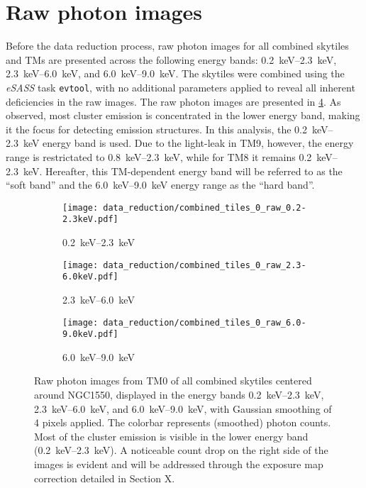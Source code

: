 \section{Raw photon images}
Before the data reduction process, raw photon images for all combined skytiles and TMs are presented across the following energy bands: \SIrange{0.2}{2.3}{\kilo\electronvolt}, \SIrange{2.3}{6.0}{\kilo\electronvolt}, and \SIrange{6.0}{9.0}{\kilo\electronvolt}. The skytiles were combined using the \textit{eSASS} task \texttt{evtool}, with no additional parameters applied to reveal all inherent deficiencies in the raw images. The raw photon images are presented in \ref{fig:raw_photon_images}. As observed, most cluster emission is concentrated in the lower energy band, making it the focus for detecting emission structures. In this analysis, the \SIrange{0.2}{2.3}{\kilo\electronvolt} energy band is used. Due to the light-leak in TM9, however, the energy range is restrictated to \SIrange{0.8}{2.3}{\kilo\electronvolt}, while for TM8 it remains \SIrange{0.2}{2.3}{\kilo\electronvolt}. Hereafter, this TM-dependent energy band will be referred to as the \enquote{soft band} and the \SIrange{6.0}{9.0}{\kilo\electronvolt} energy range as the \enquote{hard band}. 
\begin{figure}[htbp]
    \centering
    \begin{subfigure}{0.32\textwidth}
        \centering
        \texttt{[image: data\_reduction/combined\_tiles\_0\_raw\_0.2-2.3keV.pdf]}
        \caption{\SIrange{0.2}{2.3}{\kilo\electronvolt}}
        \label{fig:low_energy}
    \end{subfigure}
    \hfill
    \begin{subfigure}{0.32\textwidth}
        \centering
        \texttt{[image: data\_reduction/combined\_tiles\_0\_raw\_2.3-6.0keV.pdf]}
        \caption{\SIrange{2.3}{6.0}{\kilo\electronvolt}}
        \label{fig:mid_energy}
    \end{subfigure}
    \hfill
    \begin{subfigure}{0.32\textwidth}
        \centering
        \texttt{[image: data\_reduction/combined\_tiles\_0\_raw\_6.0-9.0keV.pdf]}
        \caption{\SIrange{6.0}{9.0}{\kilo\electronvolt}}
        \label{fig:high_energy}
    \end{subfigure}
    \caption{Raw photon images from TM0 of all combined skytiles centered around NGC1550, displayed in the energy bands \SIrange{0.2}{2.3}{\kilo\electronvolt}, \SIrange{2.3}{6.0}{\kilo\electronvolt}, and \SIrange{6.0}{9.0}{\kilo\electronvolt}, with Gaussian smoothing of 4 pixels applied. The colorbar represents (smoothed) photon counts. Most of the cluster emission is visible in the lower energy band (\SIrange{0.2}{2.3}{\kilo\electronvolt}). A noticeable count drop on the right side of the images is evident and will be addressed through the exposure map correction detailed in Section X.}
    \label{fig:raw_photon_images}
\end{figure}
%
